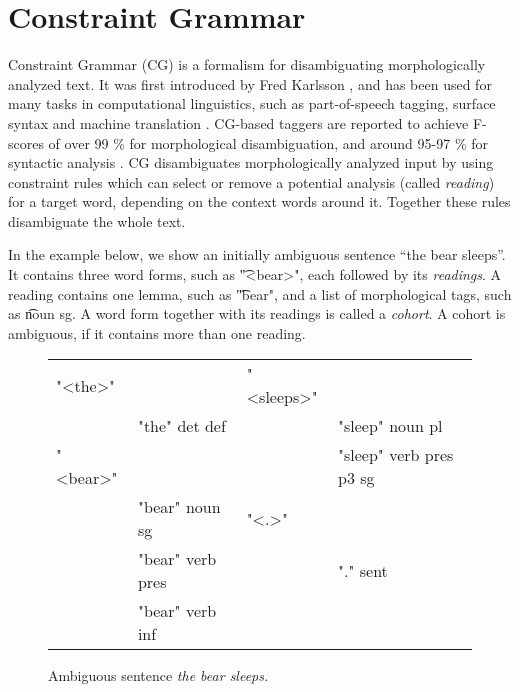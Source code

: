 \def\pmcfg{PMCFG}
\def\gf{GF}
\def\cg{CG}
\def\fsig{FSIG}
\newcommand{\quality}[1]{${\tt Quality_{#1}}$}
\newcommand{\kind}[1]{${\tt Kind_{#1}}$}
\newcommand{\very}[1]{${\tt Very_{#1}}$}
\newcommand{\comment}{${\tt Comment}$}
\newcommand{\modFun}[2]{${\tt Mod_{#1,#2}}$}
\newcommand{\predFun}[3]{${\tt Pred_{#1,#2,#3}}$}
\newcommand{\itemSpa}[2]{${\tt Item_{#1,#2}}$}
\newcommand{\itemEng}[1]{${\tt Item_{#1}}$}

\section{Constraint Grammar}
\label{sec:cg-intro}

Constraint Grammar (\cg{}) is a formalism for 
disambiguating morphologically analyzed text. 
It was first introduced by Fred Karlsson  
\cite{karlsson1990cgp,karlsson1995constraint}, and has been used for
many tasks in computational linguistics, such as part-of-speech
tagging, surface syntax and machine translation \cite{bick2011}.
\cg{}-based taggers are reported to achieve F-scores of over 99 \% for
morphological disambiguation, and around 95-97 \% for syntactic analysis
\cite{bick2000palavras,bick2003hybridCG_PSG,bick2006spanish}. 
\cg{} disambiguates morphologically analyzed input by using constraint
rules which can select or remove a potential analysis (called
\emph{reading}) for a target word, depending on the context words
around it.  Together these rules disambiguate the whole text.


In the example below, we show an initially ambiguous sentence ``the bear
sleeps''. 
It contains three word forms, such as \t{"<bear>"}, each followed by its \emph{readings}.
A reading contains one lemma, such as \t{"bear"}, and a list of morphological tags, such as \t{noun sg}.
A word form together with its readings is called a \emph{cohort}. A cohort is ambiguous, if it contains more than one reading.

\begin{figure}[h]
\centering
\ttfamily
\begin{tabular}{p{0.6cm} l  p{0.6cm} l}
"<the>"  &                & "<sleeps>"        \\
    & "the" det def       &     & "sleep" noun pl \\
"<bear>" &                &     & "sleep" verb pres p3 sg \\
    & "bear" noun sg      & "<.>"                   \\
    & "bear" verb pres    &     & "." sent          \\
    & "bear" verb inf \\
\end{tabular}
\label{fig:theBearSleeps}
\caption{Ambiguous sentence {\em the bear sleeps.}}
\end{figure}


